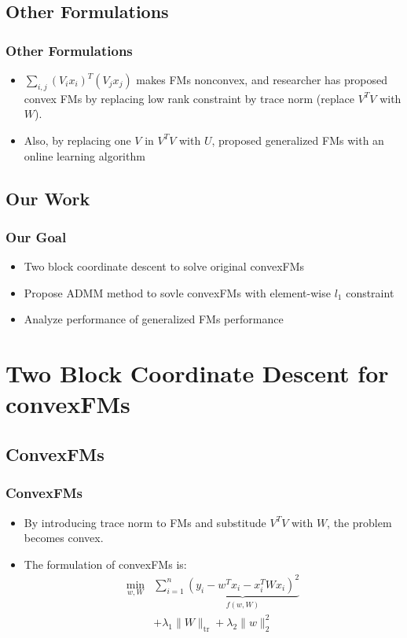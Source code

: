 \documentclass{beamer}
\begin{document}
  \subsection{Other Formulations}
  \begin{frame}
  \frametitle{Other Formulations}
    \begin{itemize}
      \item $\sum_{i, j} (V_ix_i)^T(V_jx_j)$ makes FMs nonconvex, and researcher has proposed convex FMs \cite{blondel2015convex} by replacing low rank constraint by trace norm (replace $V^TV$ with $W$).
      \item Also, by replacing one $V$ in $V^T V$ with $U$, \cite{lin2016non} proposed generalized FMs with an online learning algorithm
    \end{itemize}
  \end{frame}

  \subsection{Our Work}
  \begin{frame}
  \frametitle{Our Goal}
    \begin{itemize}
    \item Two block coordinate descent to solve original convexFMs
      \item Propose ADMM method to sovle convexFMs with element-wise $l_1$ constraint
      \item Analyze performance of generalized FMs performance 
    \end{itemize}
  \end{frame}

\section{Two Block Coordinate Descent for convexFMs} %
\subsection{ConvexFMs}
\begin{frame}
\frametitle{ConvexFMs}
\begin{itemize}
  \item By introducing trace norm to FMs and substitude $V^TV$ with $W$, the problem becomes convex.
  \item The formulation of convexFMs is:
    \begin{align*}
      \min_{w, W} & \sum_{i = 1}^n \underbrace{(y_i - w^Tx_i - x_i^T W x_i)^2}_{f(w, W)} \\
      & + \lambda_1 \|W\|_{\text{tr}} + \lambda_2 \|w\|_2^2
    \end{align*}
\end{itemize}
\end{frame}
\end{document}
